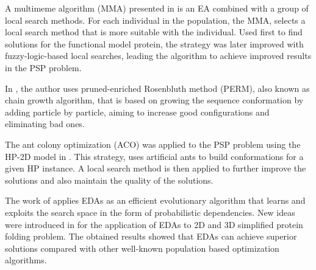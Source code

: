 \documentclass[conference]{IEEEtran}
\begin{document}
A multimeme algorithm (MMA) presented in \cite{krasnogor2002multimeme} is an EA combined with a
group of local search methods. For each individual in the population, the MMA, selects a local search method that is more suitable with the individual. Used first to find solutions for the functional model protein, the strategy was later improved with fuzzy-logic-based local searches, leading the algorithm to achieve improved results in the PSP problem.







In \cite{hsu2003growth}, the author uses  pruned-enriched Rosenbluth method (PERM), also known as chain growth algorithm, that is based on growing the sequence conformation by adding particle by particle, aiming to increase good configurations and eliminating bad ones.


The ant colony optimization (ACO) was applied to the PSP problem using the HP-2D model in \cite{shmygelska2002ant, shmygelska2003improved}. This strategy, uses artificial ants to build conformations for a given HP instance. A local search method is then applied to further improve the solutions and also maintain the quality of the solutions.

The work of \cite{santana2008component} applies EDAs as an efficient evolutionary algorithm that learns and exploits the search space in the form of probabilistic dependencies. New ideas were introduced in \cite{santana2008component}
for the application of EDAs to 2D and 3D simplified protein folding problem. The obtained results showed that EDAs can achieve superior solutions compared with other well-known population based optimization algorithms.



\end{document}
